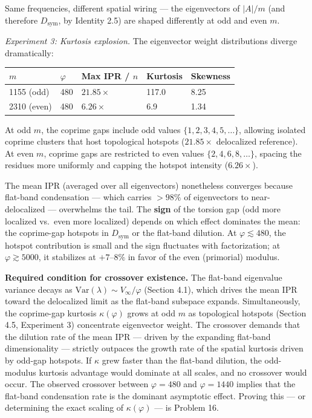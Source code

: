 \documentclass[11pt,letterpaper]{article}
\theoremstyle{definition}
\theoremstyle{remark}
\begin{document}
Same frequencies, different spatial wiring --- the eigenvectors of $|A|/m$ (and therefore $D_{\text{sym}}$, by Identity 2.5) are shaped differently at odd and even $m$.

\emph{Experiment 3: Kurtosis explosion.} The eigenvector weight distributions diverge dramatically:

\begin{longtable}[]{@{}lllll@{}}
\toprule
$m$ & $\varphi$ & Max IPR / $n$ & Kurtosis & Skewness \\
\midrule
\endhead
\bottomrule
1155 (odd) & 480 & $21.85\times$ & 117.0 & 8.25 \\
2310 (even) & 480 & $6.26\times$ & 6.9 & 1.34 \\
\end{longtable}

At odd $m$, the coprime gaps include odd values $\{1, 2, 3, 4, 5, \ldots\}$, allowing isolated coprime clusters that host topological hotspots ($21.85\times$ delocalized reference). At even $m$, coprime gaps are restricted to even values $\{2, 4, 6, 8, \ldots\}$, spacing the residues more uniformly and capping the hotspot intensity ($6.26\times$).

The mean IPR (averaged over all eigenvectors) nonetheless converges because flat-band condensation --- which carries $> 98\%$ of eigenvectors to near-delocalized --- overwhelms the tail. The \textbf{sign} of the torsion gap (odd more localized vs.~even more localized) depends on which effect dominates the mean: the coprime-gap hotspots in $D_{\text{sym}}$ or the flat-band dilution. At $\varphi \lesssim 480$, the hotspot contribution is small and the sign fluctuates with factorization; at $\varphi \gtrsim 5000$, it stabilizes at $+7$--$8\%$ in favor of the even (primorial) modulus.

\textbf{Required condition for crossover existence.} The flat-band eigenvalue variance decays as $\text{Var}(\lambda) \sim V_\infty / \varphi$ (Section 4.1), which drives the mean IPR toward the delocalized limit as the flat-band subspace expands. Simultaneously, the coprime-gap kurtosis $\kappa(\varphi)$ grows at odd $m$ as topological hotspots (Section 4.5, Experiment 3) concentrate eigenvector weight. The crossover demands that the dilution rate of the mean IPR --- driven by the expanding flat-band dimensionality --- strictly outpaces the growth rate of the spatial kurtosis driven by odd-gap hotspots. If $\kappa$ grew faster than the flat-band dilution, the odd-modulus kurtosis advantage would dominate at all scales, and no crossover would occur. The observed crossover between $\varphi = 480$ and $\varphi = 1440$ implies that the flat-band condensation rate is the dominant asymptotic effect. Proving this --- or determining the exact scaling of $\kappa(\varphi)$ --- is Problem 16.
\end{document}

